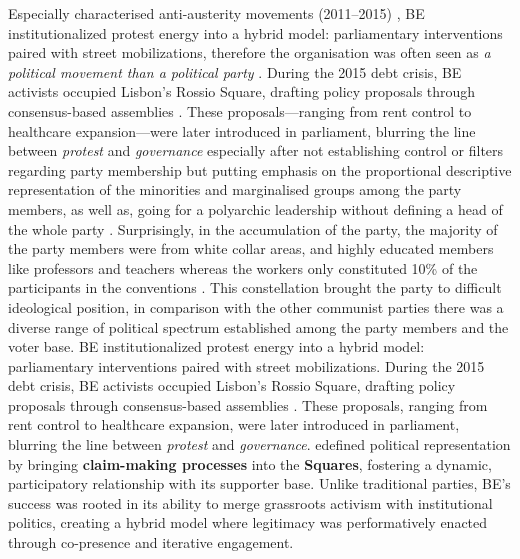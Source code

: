 Especially characterised anti-austerity movements (2011–2015) \parencite{principe2017}, BE institutionalized protest energy into a hybrid model: parliamentary interventions paired with street mobilizations, therefore the organisation was often seen as \emph{a political movement than a political party} \parencite[133]{lisi2009}. During the 2015 debt crisis, BE activists occupied Lisbon’s Rossio Square, drafting policy proposals through consensus-based assemblies \parencite{onlinesocialistmagazine2011}. These proposals—ranging from rent control to healthcare expansion—were later introduced in parliament, blurring the line between \textit{protest} and \textit{governance} especially after not establishing control or filters regarding party membership but putting emphasis on the proportional descriptive representation of the minorities and marginalised groups among the party members, as well as, going for a polyarchic leadership without defining a head of the whole party \parencite[133]{lisi2009}. Surprisingly, in the accumulation of the party, the majority of the party members were from white collar areas, and highly educated members like professors and teachers whereas the workers only constituted 10\% of the participants in the conventions \parencite[133]{lisi2009}. This constellation brought the party to difficult ideological position, in comparison with the other communist parties there was a diverse range of political spectrum established among the party members and the voter base. BE institutionalized protest energy into a hybrid model: parliamentary interventions paired with street mobilizations. During the 2015 debt crisis, BE activists occupied Lisbon’s Rossio Square, drafting policy proposals through consensus-based assemblies \parencite{principe2017}. These proposals, ranging from rent control to healthcare expansion, were later introduced in parliament, blurring the line between \textit{protest} and \textit{governance}. edefined political representation by bringing \textbf{claim-making processes} into the \textbf{Squares}, fostering a dynamic, participatory relationship with its supporter base. Unlike traditional parties, BE’s success was rooted in its ability to merge grassroots activism with institutional politics, creating a hybrid model where legitimacy was performatively enacted through co-presence and iterative engagement.



